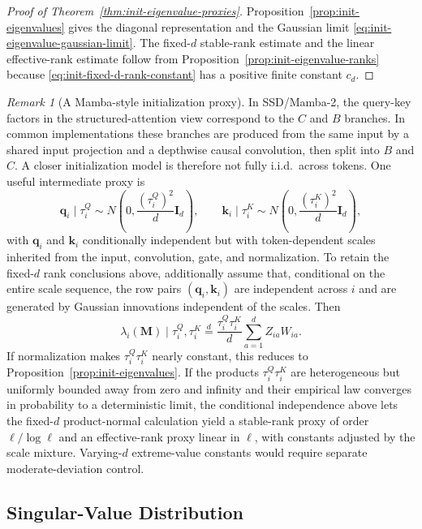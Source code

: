 \documentclass{article}
\newcommand{\bM}{\mathbf{M}}
\theoremstyle{definition}
\theoremstyle{remark}
\newtheorem{remark}[theorem]{Remark}
\begin{document}
\begin{proof}[Proof of Theorem~\ref{thm:init-eigenvalue-proxies}]
Proposition~\ref{prop:init-eigenvalues} gives the diagonal representation and
the Gaussian limit \eqref{eq:init-eigenvalue-gaussian-limit}.  The fixed-$d$
stable-rank estimate and the linear effective-rank estimate follow from
Proposition~\ref{prop:init-eigenvalue-ranks} because
\eqref{eq:init-fixed-d-rank-constant} has a positive finite constant $c_d$.
\end{proof}

\begin{remark}[A Mamba-style initialization proxy]
In SSD/Mamba-2, the query-key factors in the structured-attention view
correspond to the $C$ and $B$ branches.  In common implementations these
branches are produced from the same input by a shared input projection and a
depthwise causal convolution, then split into $B$ and $C$.  A closer
initialization model is therefore not fully i.i.d.\ across tokens.  One useful
intermediate proxy is
\[
    \mathbf q_i\mid \tau_i^Q
    \sim
    N\left(0,\frac{(\tau_i^Q)^2}{d}\mathbf I_d\right),
    \qquad
    \mathbf k_i\mid \tau_i^K
    \sim
    N\left(0,\frac{(\tau_i^K)^2}{d}\mathbf I_d\right),
\]
with $\mathbf q_i$ and $\mathbf k_i$ conditionally independent but with
token-dependent scales inherited from the input, convolution, gate, and
normalization.  To retain the fixed-$d$ rank conclusions above, additionally
assume that, conditional on the entire scale sequence, the row pairs
$(\mathbf q_i,\mathbf k_i)$ are independent across $i$ and are generated by
Gaussian innovations independent of the scales.  Then
\[
    \lambda_i(\bM)\mid \tau_i^Q,\tau_i^K
    \stackrel{d}{=}
    \frac{\tau_i^Q\tau_i^K}{d}
    \sum_{a=1}^d Z_{ia}W_{ia}.
\]
If normalization makes $\tau_i^Q\tau_i^K$ nearly constant, this reduces to
Proposition~\ref{prop:init-eigenvalues}.  If the products
$\tau_i^Q\tau_i^K$ are heterogeneous but uniformly bounded away from zero and
infinity and their empirical law converges in probability to a deterministic
limit, the conditional independence above lets the fixed-$d$ product-normal
calculation yield a stable-rank proxy of order $\ell/\log\ell$ and an
effective-rank proxy linear in $\ell$, with constants adjusted by the scale
mixture.  Varying-$d$ extreme-value constants would require separate
moderate-deviation control.
\label{rem:mamba-init-proxy}
\end{remark}

\subsection{Singular-Value Distribution}
\end{document}
